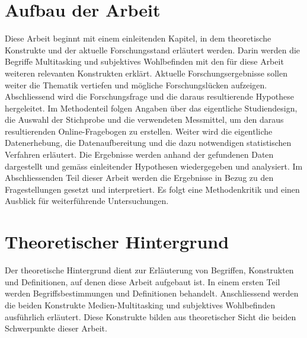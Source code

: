 \section{Aufbau der Arbeit}\label{section.einleitung.aufbau}
Diese Arbeit beginnt mit einem einleitenden Kapitel, in dem theoretische Konstrukte und der aktuelle Forschungsstand erläutert werden. Darin werden die Begriffe Multitasking und subjektives Wohlbefinden mit den für diese Arbeit weiteren relevanten Konstrukten erklärt. Aktuelle Forschungsergebnisse sollen weiter die Thematik vertiefen und mögliche Forschungslücken aufzeigen. Abschliessend wird die Forschungsfrage und die daraus resultierende Hypothese hergeleitet. Im Methodenteil folgen Angaben über das eigentliche Studiendesign, die Auswahl der Stichprobe und die verwendeten Messmittel, um den daraus resultierenden Online-Fragebogen zu erstellen. Weiter wird die eigentliche Datenerhebung, die Datenaufbereitung und die dazu notwendigen statistischen Verfahren erläutert. Die Ergebnisse werden anhand der gefundenen Daten dargestellt und gemäss einleitender Hypothesen wiedergegeben und analysiert. Im Abschliessenden Teil dieser Arbeit werden die Ergebnisse in Bezug zu den Fragestellungen gesetzt und interpretiert. Es folgt eine Methodenkritik und einen Ausblick für weiterführende Untersuchungen.

\section{Theoretischer Hintergrund}\label{section.einleitung.theoHintegrund}
Der theoretische Hintergrund dient zur Erläuterung von Begriffen, Konstrukten und Definitionen, auf denen diese Arbeit aufgebaut ist. In einem ersten Teil werden Begriffsbestimmungen und Definitionen behandelt. Anschliessend werden die beiden Konstrukte Medien-Multitasking und subjektives Wohlbefinden ausführlich erläutert. Diese Konstrukte bilden aus theoretischer Sicht die beiden Schwerpunkte dieser Arbeit.
